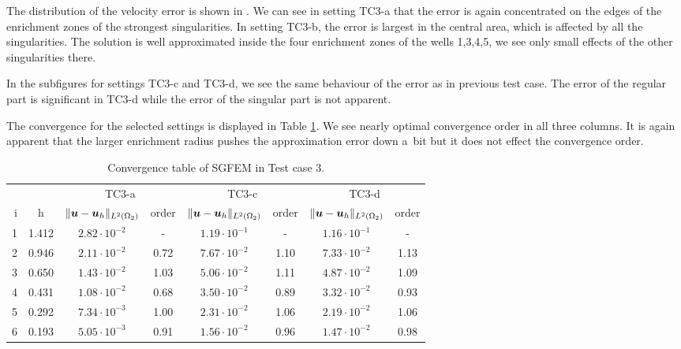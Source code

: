 %

The distribution of the velocity error is shown in . 
We can see in setting TC3-a that the error is again concentrated on the edges of the enrichment zones of
the strongest singularities. In setting TC3-b, the error is largest in the central area, 
which is affected by all the singularities. The solution is well approximated inside the four enrichment zones
of the wells 1,3,4,5, we see only small effects of the other singularities there.

In the subfigures for settings TC3-c and TC3-d, we see the same behaviour of the error as in previous test case.
The error of the regular part is significant in TC3-d while the error of the singular part is not apparent.

The convergence for the selected settings is displayed in Table \ref{tab:mh_tc3_convergence}.
We see nearly optimal convergence order in all three columns. It is again apparent that
the larger enrichment radius pushes the approximation error down a~bit but it does not effect the
convergence order.

\begin{table}[!htb]
\begin{center}
\bgroup
\def\arraystretch{1.2}
\setlength\tabcolsep{5pt}
\begin{tabular}{rc|cc|cc|cc}
\toprule
\multicolumn{2}{c|}{} & \multicolumn{2}{c|}{ TC3-a } & \multicolumn{2}{c|}{ TC3-c } & \multicolumn{2}{c}{TC3-d}\\ [3pt] %
i & h & $\|\mathbf{\boldsymbol{u}}-\mathbf{\boldsymbol{u}}_h\|_{L^2(\Omega_2)}$ & order & $\|\mathbf{\boldsymbol{u}}-\mathbf{\boldsymbol{u}}_h\|_{L^2(\Omega_2)}$
    & order & $\|\mathbf{\boldsymbol{u}}-\mathbf{\boldsymbol{u}}_h\|_{L^2(\Omega_2)}$ & order \\ [3pt] \midrule
1 & 1.412 & $2.82\cdot10^{-2}$  &  -   & $1.19\cdot10^{-1}$  &  -   & $1.16\cdot10^{-1}$ &   -   \\
2 & 0.946 & $2.11\cdot10^{-2}$  & 0.72 & $7.67\cdot10^{-2}$  & 1.10 & $7.33\cdot10^{-2}$ &  1.13 \\
3 & 0.650 & $1.43\cdot10^{-2}$  & 1.03 & $5.06\cdot10^{-2}$  & 1.11 & $4.87\cdot10^{-2}$ &  1.09 \\
4 & 0.431 & $1.08\cdot10^{-2}$  & 0.68 & $3.50\cdot10^{-2}$  & 0.89 & $3.32\cdot10^{-2}$ &  0.93 \\
5 & 0.292 & $7.34\cdot10^{-3}$  & 1.00 & $2.31\cdot10^{-2}$  & 1.06 & $2.19\cdot10^{-2}$ &  1.06 \\
6 & 0.193 & $5.05\cdot10^{-3}$  & 0.91 & $1.56\cdot10^{-2}$  & 0.96 & $1.47\cdot10^{-2}$ &  0.98 \\
\bottomrule
\end{tabular}
\caption{Convergence table of SGFEM in Test case 3.}
\label{tab:mh_tc3_convergence}
\egroup
\end{center}
\end{table}

